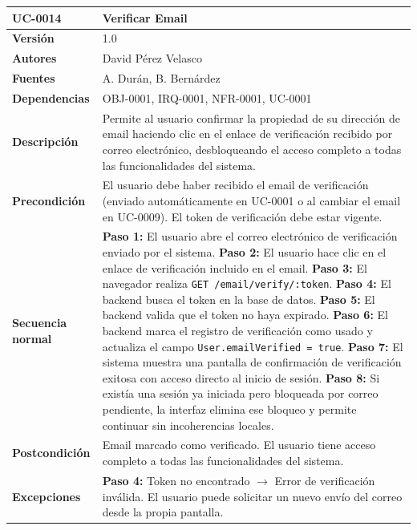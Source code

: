 \documentclass[11pt, a4paper]{article}
\begin{document}
\begin{longtable}{|p{4cm}|p{10cm}|}
\hline
\textbf{UC-0014} & Verificar Email \\
\hline
\textbf{Versión} & 1.0 \\
\hline
\textbf{Autores} & David Pérez Velasco \\
\hline
\textbf{Fuentes} & A. Durán, B. Bernárdez \\
\hline
\textbf{Dependencias} & OBJ-0001, IRQ-0001, NFR-0001, UC-0001 \\
\hline
\textbf{Descripción} & Permite al usuario confirmar la propiedad de su dirección de email haciendo clic en el enlace de verificación recibido por correo electrónico, desbloqueando el acceso completo a todas las funcionalidades del sistema. \\
\hline
\textbf{Precondición} & El usuario debe haber recibido el email de verificación (enviado automáticamente en UC-0001 o al cambiar el email en UC-0009). El token de verificación debe estar vigente. \\
\hline
\textbf{Secuencia normal} &
\textbf{Paso 1:} El usuario abre el correo electrónico de verificación enviado por el sistema.\newline
\textbf{Paso 2:} El usuario hace clic en el enlace de verificación incluido en el email.\newline
\textbf{Paso 3:} El navegador realiza \texttt{GET /email/verify/:token}.\newline
\textbf{Paso 4:} El backend busca el token en la base de datos.\newline
\textbf{Paso 5:} El backend valida que el token no haya expirado.\newline
\textbf{Paso 6:} El backend marca el registro de verificación como usado y actualiza el campo \texttt{User.emailVerified = true}.\newline
\textbf{Paso 7:} El sistema muestra una pantalla de confirmación de verificación exitosa con acceso directo al inicio de sesión.\newline
\textbf{Paso 8:} Si existía una sesión ya iniciada pero bloqueada por correo pendiente, la interfaz elimina ese bloqueo y permite continuar sin incoherencias locales.\\
\hline
\textbf{Postcondición} & Email marcado como verificado. El usuario tiene acceso completo a todas las funcionalidades del sistema. \\
\hline
\textbf{Excepciones} &
\textbf{Paso 4:} Token no encontrado $\rightarrow$ Error de verificación inválida. El usuario puede solicitar un nuevo envío del correo desde la propia pantalla.\newline

\end{longtable}
\end{document}
